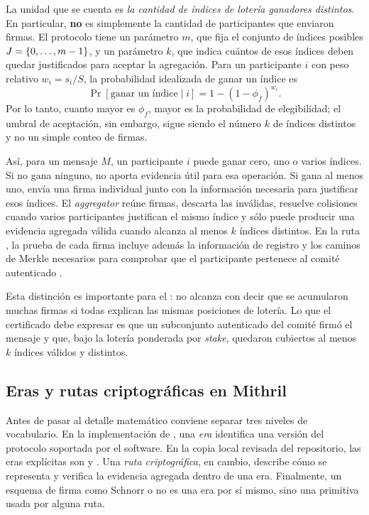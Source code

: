 La unidad que se cuenta es \textit{la cantidad de índices de lotería ganadores distintos}. En particular, \textbf{no} es simplemente la cantidad de participantes que enviaron firmas. El protocolo tiene un parámetro $m$, que fija el conjunto de índices posibles $J = \{0,\ldots,m-1\}$, y un parámetro $k$, que indica cuántos de esos índices deben quedar justificados para aceptar la agregación. Para un participante $i$ con peso relativo $w_i=s_i/S$, la probabilidad idealizada de ganar un índice es
$$
\Pr[\text{ganar un índice}\mid i] = 1-(1-\phi_f)^{w_i}.
$$
Por lo tanto, cuanto mayor es $\phi_f$, mayor es la probabilidad de elegibilidad; el umbral de aceptación, sin embargo, sigue siendo el número $k$ de índices distintos y no un simple conteo de firmas.

Así, para un mensaje $M$, un participante $i$ puede ganar cero, uno o varios índices. Si no gana ninguno, no aporta evidencia útil para esa operación. Si gana al menos uno, envía una firma individual junto con la información necesaria para justificar esos índices. El \textit{aggregator} reúne firmas, descarta las inválidas, resuelve colisiones cuando varios participantes justifican el mismo índice y sólo puede producir una evidencia agregada válida cuando alcanza al menos $k$ índices distintos. En la ruta \Concatenation, la prueba de cada firma incluye además la información de registro y los caminos de Merkle necesarios para comprobar que el participante pertenece al comité autenticado \cite{MithrilSTMRepo}.

Esta distinción es importante para el \zkBridge: no alcanza con decir que se acumularon muchas firmas si todas explican las mismas posiciones de lotería. Lo que el certificado \STM debe expresar es que un subconjunto autenticado del comité firmó el mensaje y que, bajo la lotería ponderada por \textit{stake}, quedaron cubiertos al menos $k$ índices válidos y distintos.

\subsection{Eras y rutas criptográficas en Mithril}
\label{subsec:protocolo-stm-y-esquemas-de-firma-eras-y-rutas-criptograficas-en-mithril}

Antes de pasar al detalle matemático conviene separar tres niveles de vocabulario. En la implementación de \Mithril, una \emph{era} identifica una versión del protocolo soportada por el software. En la copia local revisada del repositorio, las eras explícitas son \Pythagoras y \Lagrange. Una \emph{ruta criptográfica}, en cambio, describe cómo se representa y verifica la evidencia agregada dentro de una era. Finalmente, un esquema de firma como Schnorr o \BLS no es una era por sí mismo, sino una primitiva usada por alguna ruta.

